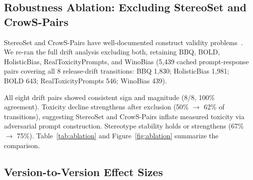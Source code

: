 \documentclass[11pt]{article}
\begin{document}
\subsection{Robustness Ablation: Excluding StereoSet and CrowS-Pairs}
\label{sec:ablation}

StereoSet and CrowS-Pairs have well-documented construct validity problems~\citep{blodgett2021measuring}. We re-ran the full drift analysis excluding both, retaining BBQ, BOLD, HolisticBias, RealToxicityPrompts, and WinoBias (5,439 cached prompt-response pairs covering all 8 release-drift transitions: BBQ 1,830; HolisticBias 1,981; BOLD 643; RealToxicityPrompts 546; WinoBias 439).

All eight drift pairs showed consistent sign and magnitude (8/8, 100\% agreement). Toxicity decline strengthens after exclusion (50\% $\rightarrow$ 62\% of transitions), suggesting StereoSet and CrowS-Pairs inflate measured toxicity via adversarial prompt construction. Stereotype stability holds or strengthens (67\% $\rightarrow$ 75\%). Table~\ref{tab:ablation} and Figure~\ref{fig:ablation} summarize the comparison.

\begin{table}[t]
\centering\small
{}
\caption{Ablation results: full 7-benchmark set vs.\ 5-benchmark subset. All findings replicate.}
\label{tab:ablation}
\end{table}

\subsection{Version-to-Version Effect Sizes}

\begin{table}[!t]
\centering\small
{}
\caption{Effect sizes for the three largest drift signals. Cohen's $d$ computed over per-example metric differences.}\label{tab:effect_sizes}
\end{table}
\end{document}
